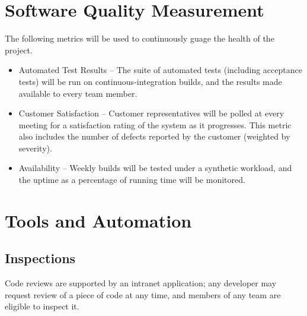 \documentclass[11pt]{wacomepd}
\begin{document}
\chapter{Software Quality Measurement}

The following metrics will be used to continuously guage the health of the project.

\begin{itemize}
\item {\sc Automated Test Results} -- The suite of automated tests (including acceptance tests) will
  be run on continuous-integration builds, and the results made available to every team member.
\item {\sc Customer Satisfaction} -- Customer representatives will be polled at every meeting for a
  satisfaction rating of the system as it progresses.  This metric also includes the number of
  defects reported by the customer (weighted by severity).
\item {\sc Availability} -- Weekly builds will be tested under a synthetic workload, and the uptime
  as a percentage of running time will be monitored.
\end{itemize}




\chapter{Tools and Automation}

\section{Inspections}
Code reviews are supported by an intranet application; any developer may request review of a
piece of code at any time, and members of any team are eligible to inspect it.
\end{document}
